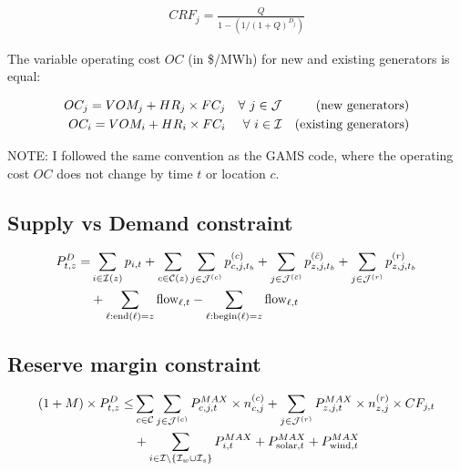 \documentclass[11pt, oneside]{article}   	%
\newcommand{\flow}{\text{flow}}
\newcommand{\bc}{\bar{c}}
\begin{document}
\begin{equation} \label{eq:cap_rec}
\begin{aligned}
CRF_j = \frac{Q}{1-\left(1/(1+Q)^{D_j}\right)}
\end{aligned}
\end{equation}

The variable operating cost $OC$ (in \$/MWh) for new and existing generators is equal:

\begin{align} \label{eq:oc}
OC_{j} = VOM_{j} + HR_{j} \times FC_{j}  &&  \forall~j \in \mathcal{J} && \text{(new generators)}\\
OC_{i} = VOM_{i} + HR_{i} \times FC_{i}  && \forall~i \in \mathcal{I} && \text{(existing generators)}
\end{align}

NOTE: I followed the same convention as the GAMS code, where the operating cost $OC$ does not change by time $t$ or location $c$.

\subsection{Supply vs Demand constraint}

\begin{equation} \label{eq:supply_demand}
\begin{split}
P^D_{t, z} = & \sum_{i \in \Ic(z)} p_{i, t} +  \sum_{c \in \Cc (z)}  \sum_{j \in \Jc^{(c)}} p^{(c)}_{c, j, t_b} + \sum_{j \in \Jc^{(\bc)}} p^{(\bc)}_{z, j, t_b} +  \sum_{j \in \Jc^{(r)}} p^{(r)}_{z, j, t_b} \\
& +  \sum_{\ell: \text{end}(\ell) = z} \flow_{\ell, t} - \sum_{\ell: \text{begin}(\ell) = z} \flow_{\ell, t}
\end{split}
\end{equation}

\subsection{Reserve margin constraint}

\begin{equation} \label{eq:reserve}
\begin{split}
(1+M)\times P^D_{t, z} \le & \sum_{c \in \mathcal{C}} \sum_{j \in \mathcal{J}^{(c)}} P^{MAX}_{c, j, t} \times n^{(c)}_{c, j} +   \sum_{j \in \mathcal{J}^{(r)}} P^{MAX}_{z, j, t} \times n^{(r)}_{z, j}\times CF_{j, t} \\
& + \sum_{i \in \mathcal{I} \setminus \{\mathcal{I}_w \cup \mathcal{I}_s \}} P^{MAX}_{i, t} + P^{MAX}_{\text{solar}, t} + P^{MAX}_{\text{wind}, t}
\end{split}
\end{equation}
\end{document}

